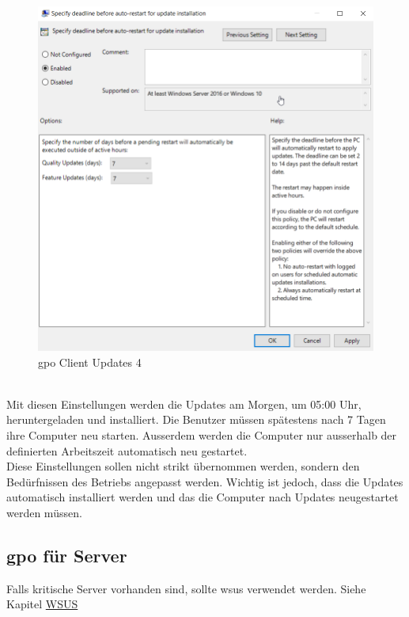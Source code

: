 \begin{minipage}{0.5\linewidth}
    \begin{figure}[H]
        \centering
        \includegraphics[width=\linewidth]{../img/Updates/client-force-restart-deadline.png}
        \caption{\acrshort{gpo} Client Updates 4}
    \end{figure}
\end{minipage}\\

Mit diesen Einstellungen werden die Updates am Morgen, um 05:00 Uhr,  heruntergeladen und installiert.
Die Benutzer müssen spätestens nach 7 Tagen ihre Computer neu starten.
Ausserdem werden die Computer nur ausserhalb der definierten Arbeitszeit automatisch neu gestartet.\\

Diese Einstellungen sollen nicht strikt übernommen werden, sondern den Bedürfnissen des Betriebs angepasst werden.
Wichtig ist jedoch, dass die Updates automatisch installiert werden und das die Computer nach Updates neugestartet werden müssen.

\subsection{\acrshort{gpo} für Server}
Falls kritische Server vorhanden sind, sollte \acrfull{wsus} verwendet werden. Siehe Kapitel \hyperref[subsec:wsus]{WSUS}\\

